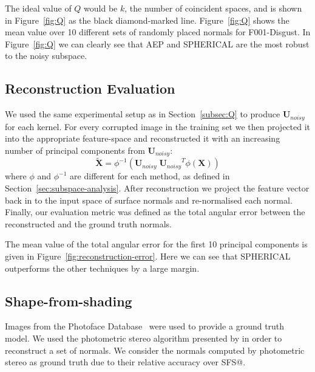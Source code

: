 The ideal value of $Q$ would be $k$, the number of coincident spaces, and is 
shown in Figure~\ref{fig:Q} as the black diamond-marked line. Figure~\ref{fig:Q} 
shows the mean value over 10 different sets of randomly placed normals for
 F001-Disgust. In Figure~\ref{fig:Q} we can clearly see that AEP and SPHERICAL 
 are the most robust to the noisy subspace.
\subsection{Reconstruction Evaluation}
We used the same experimental setup as in Section~\ref{subsec:Q} to produce 
$\boldsymbol{U}_{noisy}$ for each kernel. For every corrupted image in the 
training set we then projected it into the appropriate feature-space and 
reconstructed it with an increasing number of principal components from
 $\boldsymbol{U}_{noisy}$:
\begin{equation}\label{eq:xtilde}
    \tilde{\boldsymbol{X}} = \phi^{-1} \left( \boldsymbol{U}_{noisy} \; {\boldsymbol{U}_{noisy}}^T \phi(\boldsymbol{X}) \right)
\end{equation}
where $\phi$ and $\phi^{-1}$ are different for each method, as defined in 
Section~\ref{sec:subspace-analysis}. After reconstruction we project the 
feature vector back in to the input space of surface normals and re-normalised 
each normal. Finally, our evaluation metric was defined as the total angular
 error between the reconstructed and the ground truth normals.

The mean value of the total angular error for the first 10 principal 
components is given in Figure~\ref{fig:reconstruction-error}. Here we can 
see that SPHERICAL outperforms the other techniques by a large margin.
\subsection{Shape-from-shading}
Images from the Photoface Database~\cite{RefWorks:293} were used to provide a 
ground truth model. We used the photometric stereo algorithm presented by 
\citet{RefWorks:108} in order to reconstruct a set of normals. 
We consider the normals computed by photometric stereo as ground truth due to 
their relative accuracy over SFS@.

